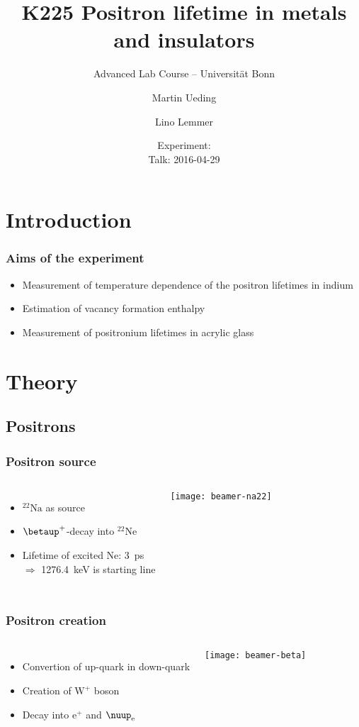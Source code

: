 \documentclass[english, fleqn]{beamer}
\title{K225 Positron lifetime in metals and insulators}
\subtitle{Advanced Lab Course -- Universität Bonn}
\author{%
    Martin Ueding
    \and
    Lino Lemmer
}
\date{Experiment: \daterange{2016-03-24}{2016-03-25} \\ Talk: 2016-04-29}
\begin{document}
\begin{frame}
    \titlepage
\end{frame}

\section{Introduction}

\begin{frame}
    \frametitle{Aims of the experiment}
    \begin{itemize}
        \item 
            Measurement of temperature dependence of the positron lifetimes in indium
        \item
            Estimation of vacancy formation enthalpy
        \item
            Measurement of positronium lifetimes in acrylic glass
    \end{itemize}
\end{frame}

\section{Theory}

\subsection{Positrons}

\begin{frame}
    \frametitle{Positron source}
    \begin{columns}[c]
        \begin{itemize}
            \item 
                ${}^{22}\text{Na}$ as source
            \item
                $\betaup^+$-decay into ${}^{22}\text{Ne}$
            \item
                Lifetime of excited Ne: \SI{3}{\pico\second} \\
                $\Rightarrow$ \SI{1276.4}{\kilo\electronvolt} is starting line
        \end{itemize}
        \centering
        \texttt{[image: beamer-na22]}
    \end{columns}
\end{frame}

\begin{frame}
    \frametitle{Positron creation}
    \begin{columns}[c]
        \begin{itemize}
            \item
                Convertion of up-quark in down-quark
            \item
                Creation of $\mathrm W^+$ boson
            \item
                Decay into $\mathrm e^+$ and $\nuup_\mathrm{e}$
        \end{itemize}
        \centering
        \texttt{[image: beamer-beta]}
    \end{columns}
\end{frame}
\end{document}
